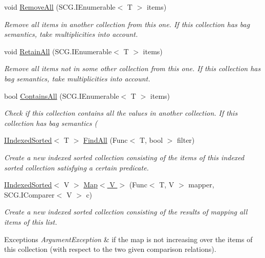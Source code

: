 \begin{DoxyCompactItemize}
void \hyperlink{class_c5_1_1_tree_set_aab27d3466268b7943b82c28d33dd1579}{Remove\+All} (S\+C\+G.\+I\+Enumerable$<$ T $>$ items)
\begin{DoxyCompactList}\small\item\em Remove all items in another collection from this one. If this collection has bag semantics, take multiplicities into account. \end{DoxyCompactList}\item 
void \hyperlink{class_c5_1_1_tree_set_aecd559b74434fcf369cd55fa0235f6e8}{Retain\+All} (S\+C\+G.\+I\+Enumerable$<$ T $>$ items)
\begin{DoxyCompactList}\small\item\em Remove all items not in some other collection from this one. If this collection has bag semantics, take multiplicities into account. \end{DoxyCompactList}\item 
bool \hyperlink{class_c5_1_1_tree_set_a89f60df47bcd103257f38983d1ae11e3}{Contains\+All} (S\+C\+G.\+I\+Enumerable$<$ T $>$ items)
\begin{DoxyCompactList}\small\item\em Check if this collection contains all the values in another collection. If this collection has bag semantics ( \end{DoxyCompactList}\item 
\hyperlink{interface_c5_1_1_i_indexed_sorted}{I\+Indexed\+Sorted}$<$ T $>$ \hyperlink{class_c5_1_1_tree_set_a851ed25581679dbbc730df97641e201a}{Find\+All} (Func$<$ T, bool $>$ filter)
\begin{DoxyCompactList}\small\item\em Create a new indexed sorted collection consisting of the items of this indexed sorted collection satisfying a certain predicate. \end{DoxyCompactList}\item 
\hyperlink{interface_c5_1_1_i_indexed_sorted}{I\+Indexed\+Sorted}$<$ V $>$ \hyperlink{class_c5_1_1_tree_set_aca8c4a532b338788c8797141f0f0d0b4}{Map$<$ V $>$} (Func$<$ T, V $>$ mapper, S\+C\+G.\+I\+Comparer$<$ V $>$ c)
\begin{DoxyCompactList}\small\item\em Create a new indexed sorted collection consisting of the results of mapping all items of this list. 
\begin{DoxyExceptions}{Exceptions}
{\em Argument\+Exception} & if the map is not increasing over the items of this collection (with respect to the two given comparison relations). \\

\end{DoxyExceptions}
\end{DoxyCompactList}
\end{DoxyCompactItemize}

